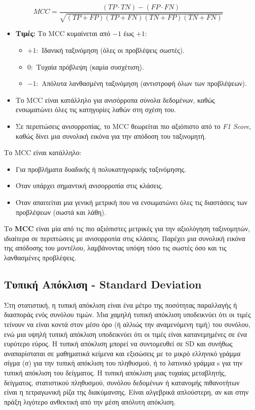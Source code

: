 \documentclass[diploma]{softlab-thesis}
\begin{document}
\[
MCC = \frac{(TP \cdot TN) - (FP \cdot FN)}{\sqrt{(TP + FP)(TP + FN)(TN + FP)(TN + FN)}}
\]

\begin{itemize}
    \item \textbf{Τιμές:}
    Το MCC κυμαίνεται από \(-1\) έως \(+1\):
    \begin{itemize}
        \item \(+1:\) Ιδανική ταξινόμηση (όλες οι προβλέψεις σωστές).
        \item \(0:\) Τυχαία πρόβλεψη (καμία συσχέτιση).
        \item \(-1:\) Απόλυτα λανθασμένη ταξινόμηση (αντιστροφή όλων των προβλέψεων).
    \end{itemize}
    
\item Το MCC είναι κατάλληλο για ανισόρροπα σύνολα δεδομένων, καθώς ενσωματώνει όλες τις κατηγορίες λαθών στη σχέση του.

\item  Σε περιπτώσεις ανισορροπίας, το MCC θεωρείται πιο αξιόπιστο από το \textit{F1 Score}, καθώς δίνει μια συνολική εικόνα για την απόδοση του ταξινομητή.
\end{itemize}

Το MCC είναι κατάλληλο:
\begin{itemize}
    \item Για προβλήματα δυαδικής ή πολυκατηγορικής ταξινόμησης.
    \item Όταν υπάρχει σημαντική ανισορροπία στις κλάσεις.
    \item Όταν απαιτείται μια γενική μετρική που να ενσωματώνει όλες τις διαστάσεις των προβλέψεων (σωστά και λάθη).
\end{itemize}

Το \textbf{MCC} είναι μία από τις πιο αξιόπιστες μετρικές για την αξιολόγηση ταξινομητών, ιδιαίτερα σε περιπτώσεις με ανισορροπία στις κλάσεις. Παρέχει μια συνολική εικόνα της απόδοσης του μοντέλου, λαμβάνοντας υπόψη τόσο τις σωστές όσο και τις λανθασμένες προβλέψεις.

\subsection{Τυπική Απόκλιση - Standard Deviation}

Στη στατιστική, η τυπική απόκλιση είναι ένα μέτρο της ποσότητας παραλλαγής ή διασποράς ενός συνόλου τιμών. Μια χαμηλή τυπική απόκλιση υποδεικνύει ότι οι τιμές τείνουν να είναι κοντά στον μέσο όρο (ή αλλιώς την αναμενόμενη τιμή) του συνόλου, ενώ μια υψηλή τυπική απόκλιση υποδεικνύει ότι οι τιμές είναι κατανεμημένες σε ένα ευρύτερο εύρος. Η τυπική απόκλιση μπορεί να συντομευθεί σε SD και συνήθως αναπαρίσταται σε μαθηματικά κείμενα και εξισώσεις με το μικρό ελληνικό γράμμα σίγμα (σ) για την τυπική απόκλιση του πληθυσμού, ή το λατινικό γράμμα s για την τυπική απόκλιση του δείγματος. Η τυπική απόκλιση μιας τυχαίας μεταβλητής, δείγματος, στατιστικού πληθυσμού, συνόλου δεδομένων ή κατανομής πιθανοτήτων είναι η τετραγωνική ρίζα της διακύμανσης. Είναι αλγεβρικά απλούστερη, αν και στην πράξη λιγότερο ανθεκτική από την μέση απόλυτη απόκλιση.
\end{document}
